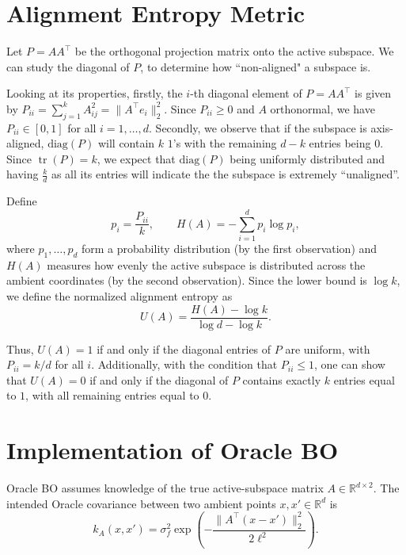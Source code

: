 \documentclass[10pt]{article}
\begin{document}

\section{Alignment Entropy Metric}
\label{app:alignment-entropy}

Let $P=AA^\top$ be the orthogonal projection matrix onto the active subspace. We can study the diagonal of $P$, to determine how ``non-aligned" a subspace is. 

Looking at its properties, firstly, the $i$-th diagonal element of $P=AA^\top$ is given by $P_{ii}=\sum_{j=1}^{k}A_{ij}^2=\|A^\top e_i\|_2^2$. Since $P_{ii}\geq 0$ and $A$ orthonormal, we have $P_{ii}\in[0,1]$ for all $i=1,\ldots,d$. Secondly, we observe that if the subspace is axis-aligned, $\mathrm{diag}(P)$ will contain $k$ $1$'s with the remaining $d-k$ entries being $0$. Since $\operatorname{tr}(P)=k$, we expect that $\mathrm{diag}(P)$ being uniformly distributed and having $\frac kd$ as all its entries will indicate the the subspace is extremely ``unaligned''. 

Define
\[
    p_i=\frac{P_{ii}}{k},
    \qquad
    H(A)=-\sum_{i=1}^{d}p_i\log p_i,
\]
where $p_1,\ldots,p_d$ form a probability distribution (by the first observation) and $H(A)$ measures how evenly the active subspace is distributed across the ambient coordinates (by the second observation). Since the lower bound is $\log k$, we define the normalized alignment entropy as
\begin{equation}
    U(A)
    =
    \frac{H(A)-\log k}{\log d-\log k}.
\end{equation}

Thus, $U(A)=1$ if and only if the diagonal entries of $P$ are uniform, with $P_{ii}=k/d$ for all $i$. Additionally, with the condition that $P_{ii} \leq 1$, one can show that $U(A)=0$ if and only if the diagonal of $P$ contains exactly $k$ entries equal to $1$, with all remaining entries equal to $0$.


\section{Implementation of Oracle BO}
\label{app:oracle-implementation}

Oracle BO assumes knowledge of the true active-subspace matrix
$A\in\mathbb{R}^{d\times 2}$. The intended Oracle covariance between two
ambient points $x,x'\in\mathbb{R}^d$ is
\[
k_A(x,x')
=
\sigma_f^2
\exp\left(
-\frac{\|A^\top(x-x')\|_2^2}{2\ell^2}
\right).
\]
\end{document}
